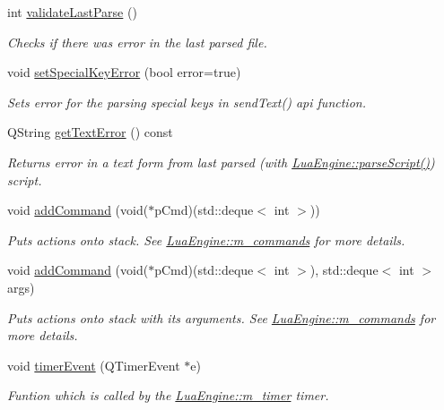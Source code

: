 \begin{DoxyCompactItemize}
int \hyperlink{class_lua_engine_aed08b6b1d8b4a637bb3e24a397ea1aaf}{validate\-Last\-Parse} ()
\begin{DoxyCompactList}\small\item\em Checks if there was error in the last parsed file. \end{DoxyCompactList}\item 
void \hyperlink{class_lua_engine_a92df2282a9f711f80f034aae6fb26303}{set\-Special\-Key\-Error} (bool error=true)
\begin{DoxyCompactList}\small\item\em Sets error for the parsing special keys in send\-Text() api function. \end{DoxyCompactList}\item 
Q\-String \hyperlink{class_lua_engine_af06d49221c25b93c334f9ed49571fa72}{get\-Text\-Error} () const 
\begin{DoxyCompactList}\small\item\em Returns error in a text form from last parsed (with \hyperlink{class_lua_engine_a5eae05f78704166f098ea20568c23fd7}{Lua\-Engine\-::parse\-Script()}) script. \end{DoxyCompactList}\item 
void \hyperlink{class_lua_engine_abeccc6545aa5cde1681cf61780044ab3}{add\-Command} (void($\ast$p\-Cmd)(std\-::deque$<$ int $>$))
\begin{DoxyCompactList}\small\item\em Puts actions onto stack. See \hyperlink{class_lua_engine_a86a3f32127e36e1ccce6c5a42a298ad5}{Lua\-Engine\-::m\-\_\-commands} for more details. \end{DoxyCompactList}\item 
void \hyperlink{class_lua_engine_a1046fcf4498761e9c35165b99ca09987}{add\-Command} (void($\ast$p\-Cmd)(std\-::deque$<$ int $>$), std\-::deque$<$ int $>$ args)
\begin{DoxyCompactList}\small\item\em Puts actions onto stack with its arguments. See \hyperlink{class_lua_engine_a86a3f32127e36e1ccce6c5a42a298ad5}{Lua\-Engine\-::m\-\_\-commands} for more details. \end{DoxyCompactList}\item 
void \hyperlink{class_lua_engine_a021846fc7d821e449fa1ce8d96c7dbc9}{timer\-Event} (Q\-Timer\-Event $\ast$e)
\begin{DoxyCompactList}\small\item\em Funtion which is called by the \hyperlink{class_lua_engine_a367284a1461c5a2d2804c3f9b4d94f14}{Lua\-Engine\-::m\-\_\-timer} timer. \end{DoxyCompactList}\item 

\end{DoxyCompactItemize}
